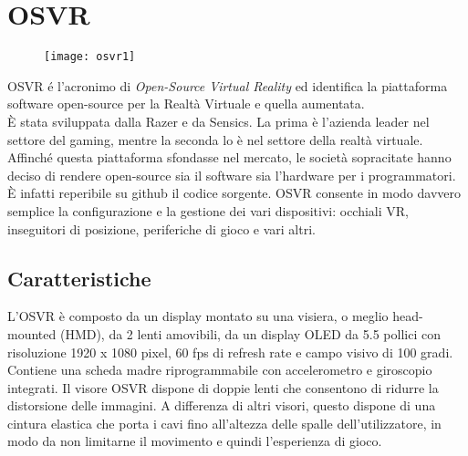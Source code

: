 \section{OSVR}
\begin{figure}[htb]
    \centering
    \vspace{-0.7cm}
    \texttt{[image: osvr1]}
    \vspace{-1cm}
\end{figure}
\noindent OSVR é l'acronimo di \textit{Open-Source Virtual Reality} ed identifica la piattaforma software open-source per la Realtà Virtuale e quella aumentata. \\È stata sviluppata dalla Razer e da Sensics. La prima è l'azienda leader nel settore del gaming, mentre la seconda lo è nel settore della realtà virtuale. Affinché questa piattaforma sfondasse nel mercato, le società sopracitate hanno deciso di rendere open-source sia il software sia l'hardware per i programmatori. È infatti reperibile su github il codice sorgente. OSVR consente in modo davvero semplice la configurazione e la gestione dei vari dispositivi: occhiali VR, inseguitori di posizione, periferiche di gioco e vari altri. 

\subsection{Caratteristiche}
L'OSVR è composto da un display montato su una visiera, o meglio head-mounted (HMD), da 2 lenti amovibili, da un display OLED da 5.5 pollici con risoluzione 1920 x 1080 pixel, 60 fps di refresh rate e campo visivo di 100 gradi. Contiene una scheda madre riprogrammabile con accelerometro e giroscopio integrati. Il visore OSVR dispone di doppie lenti che consentono di ridurre la distorsione delle immagini. A differenza di altri visori, questo dispone di una cintura elastica che porta i cavi fino all'altezza delle spalle dell'utilizzatore, in modo da non limitarne il movimento e quindi l'esperienza di gioco.\\

